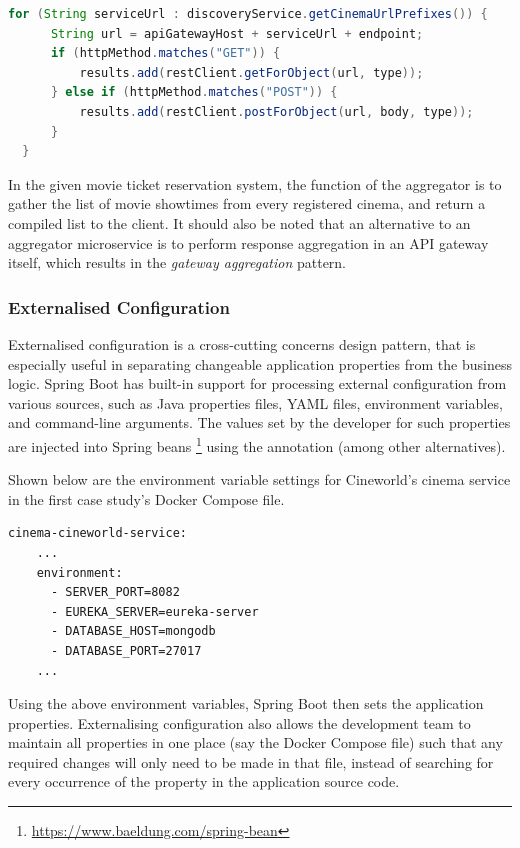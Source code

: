 \begin{lstlisting}[language=Java, caption=Snippet from \code{AggregatorService.java}]
  for (String serviceUrl : discoveryService.getCinemaUrlPrefixes()) {
      String url = apiGatewayHost + serviceUrl + endpoint;
      if (httpMethod.matches("GET")) {
          results.add(restClient.getForObject(url, type));
      } else if (httpMethod.matches("POST")) {
          results.add(restClient.postForObject(url, body, type));
      }
  }
\end{lstlisting}

In the given movie ticket reservation system, the function of the aggregator is to gather the list of movie showtimes from every registered cinema, and return a compiled list to the client. It should also be noted that an alternative to an aggregator microservice is to perform response aggregation in an API gateway itself, which results in the \textit{gateway aggregation} pattern.

\subsubsection{Externalised Configuration}

Externalised configuration is a cross-cutting concerns design pattern, that is especially useful in separating changeable application properties from the business logic. Spring Boot has built-in support for processing external configuration from various sources, such as Java properties files, YAML files, environment variables, and command-line arguments. The values set by the developer for such properties are injected into Spring beans \footnote{\url{https://www.baeldung.com/spring-bean}} using the  annotation (among other alternatives).

Shown below are the environment variable settings for Cineworld's cinema service in the first case study's Docker Compose file.
\begin{lstlisting}[caption=Snippet from \code{docker-compose.yml}]
  cinema-cineworld-service:
    ...
    environment:
      - SERVER_PORT=8082
      - EUREKA_SERVER=eureka-server
      - DATABASE_HOST=mongodb
      - DATABASE_PORT=27017
    ...
\end{lstlisting}

Using the above environment variables, Spring Boot then sets the application properties. Externalising configuration also allows the development team to maintain all properties in one place (say the Docker Compose file) such that any required changes will only need to be made in that file, instead of searching for every occurrence of the property in the application source code.

